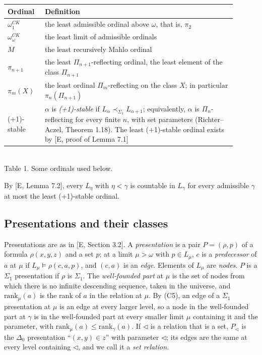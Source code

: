 \documentclass[11pt]{article}
\begin{document}
\begin{center}\begin{tabular}{p{0.14\linewidth}p{0.76\linewidth}}
\toprule
Ordinal & Definition \\
\midrule
$\omega_1^{CK}$ & the least admissible ordinal above $\omega$, that is, $\pi_2$ \\
$\omega_\omega^{CK}$ & the least limit of admissible ordinals \\
$M$ & the least recursively Mahlo ordinal \\
$\pi_{n+1}$ & the least $\Pi_{n+1}$-reflecting ordinal, the least element of the class $\Pi_{n+1}$ \\
$\pi_m(X)$ & the least ordinal $\Pi_m$-reflecting on the class $X$; in particular $\pi_n(\Pi_{n+1})$ \\
(+1)-stable & $\alpha$ is \emph{(+1)-stable} if $L_\alpha \prec_{\Sigma_1} L_{\alpha+1}$; equivalently, $\alpha$ is $\Pi_n$-reflecting for every finite $n$, with set parameters (Richter--Aczel, Theorem 1.18). The least (+1)-stable ordinal exists by [E, proof of Lemma 7.1] \\
\bottomrule
\end{tabular}\\[0.4em]Table 1. Some ordinals used below.\end{center}

By [E, Lemma 7.2], every $L_\eta$ with $\eta < \gamma$ is countable in $L_\gamma$ for every admissible $\gamma$ at
most the least (+1)-stable ordinal.

\subsection{Presentations and their classes}

Presentations are as in [E, Section 3.2]. A \emph{presentation} is a pair $P = (\rho, p)$ of a formula $\rho(x,y,z)$
and a set $p$; at a limit $\mu > \omega$ with $p \in L_\mu$, $c$ is a \emph{predecessor} of $a$ at $\mu$ if $L_\mu
\models \rho(c, a, p)$, and $(c,a)$ is an \emph{edge}. Elements of $L_\mu$ are \emph{nodes}. $P$ is a $\Sigma_1$
presentation if $\rho$ is $\Sigma_1$. The \emph{well-founded part} at $\mu$ is the set of nodes from which there is no
infinite descending sequence, taken in the universe, and $\mathrm{rank}_\mu(a)$ is the rank of $a$ in the relation at
$\mu$. By (C5), an edge of a $\Sigma_1$ presentation at $\mu$ is an edge at every larger level, so a node in the
well-founded part at $\gamma$ is in the well-founded part at every smaller limit $\mu$ containing it and the parameter,
with $\mathrm{rank}_\mu(a) \le \mathrm{rank}_\gamma(a)$. If $\lhd$ is a relation that is a set, $P_\lhd$ is the
$\Delta_0$ presentation ``$(x,y) \in z$'' with parameter $\lhd$; its edges are the same at every level containing
$\lhd$, and we call it a \emph{set relation}.
\end{document}
